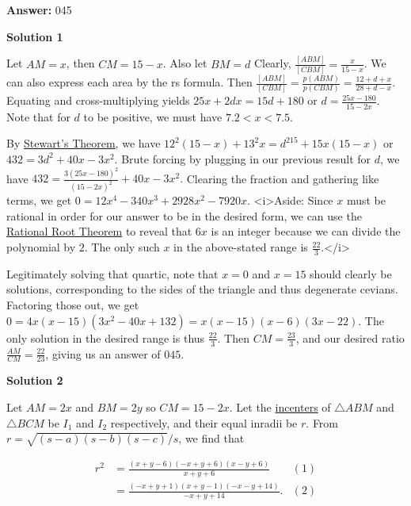 \begin{enumerate}
 
 \textbf{Answer: }045



\textbf{Solution 1}

Let $AM = x$, then $CM = 15 - x$. Also let $BM = d$ Clearly, $\frac {[ABM]}{[CBM]} = \frac {x}{15 - x}$. We can also express each area by the rs formula. Then $\frac {[ABM]}{[CBM]} = \frac {p(ABM)}{p(CBM)} = \frac {12 + d + x}{28 + d - x}$. Equating and cross-multiplying yields $25x + 2dx = 15d + 180$ or $d = \frac {25x - 180}{15 - 2x}.$ Note that for $d$ to be positive, we must have $7.2 < x < 7.5$.

 By \href{https://artofproblemsolving.com/wiki/index.php?title=Stewart\%27s\_Theorem}{Stewart's Theorem}, we have $12^2(15 - x) + 13^2x = d^215 + 15x(15 - x)$ or $432 = 3d^2 + 40x - 3x^2.$ Brute forcing by plugging in our previous result for $d$, we have $432 = \frac {3(25x - 180)^2}{(15 - 2x)^2} + 40x - 3x^2.$ Clearing the fraction and gathering like terms, we get $0 = 12x^4 - 340x^3 + 2928x^2 - 7920x.$
<i>Aside: Since $x$ must be rational in order for our answer to be in the desired form, we can use the \href{https://artofproblemsolving.com/wiki/index.php?title=Rational\_Root\_Theorem}{Rational Root Theorem} to reveal that $6x$ is an integer because we can divide the polynomial by $2$. The only such $x$ in the above-stated range is $\frac {22}3$.</i>

 Legitimately solving that quartic, note that $x = 0$ and $x = 15$ should clearly be solutions, corresponding to the sides of the triangle and thus degenerate cevians. Factoring those out, we get $0 = 4x(x - 15)(3x^2 - 40x + 132) = x(x - 15)(x - 6)(3x - 22).$ The only solution in the desired range is thus $\frac {22}3$. Then $CM = \frac {23}3$, and our desired ratio $\frac {AM}{CM} = \frac {22}{23}$, giving us an answer of $\boxed{045}$.

 



\textbf{Solution 2}

Let $AM = 2x$ and $BM = 2y$ so $CM = 15 - 2x$. Let the \href{https://artofproblemsolving.com/wiki/index.php?title=Incenter}{incenters} of $\triangle ABM$ and $\triangle BCM$ be $I_1$ and $I_2$ respectively, and their equal inradii be $r$. From $r = \sqrt {(s - a)(s - b)(s - c)}/s$, we find that

 
 \begin{align*}r^2 & = \frac {(x + y - 6)( - x + y + 6)(x - y + 6)}{x + y + 6} & (1) \\ & = \frac {( - x + y + 1)(x + y - 1)( - x - y + 14)}{ - x + y + 14}. & (2) \end{align*}



\end{enumerate}
